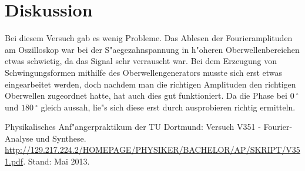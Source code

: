 \section{Diskussion}
\label{diskussion}

	Bei diesem Versuch gab es wenig Probleme. Das Ablesen der Fourieramplituden am Oszilloskop war bei der S"aegezahnspannung in h"oheren Oberwellenbereichen etwas schwietig, da das Signal sehr verrauscht war.
	Bei dem Erzeugung von Schwingungsformen mithilfe des Oberwellengenerators musste sich erst etwas eingearbeitet werden, doch nachdem man die richtigen Amplituden den richtigen Oberwellen zugeordnet hatte, hat auch dies gut funktioniert.
	Da die Phase bei $\SI{0}{^\circ}$ und $\SI{180}{^\circ}$ gleich aussah, lie"s sich diese erst durch ausprobieren richtig ermitteln.

\begin{thebibliography}{9}
	 Physikalisches Anf"angerpraktikum der TU Dortmund: Versuch V351 - Fourier-Analyse und Synthese. \url{http://129.217.224.2/HOMEPAGE/PHYSIKER/BACHELOR/AP/SKRIPT/V351.pdf}. Stand: Mai 2013.
\end{thebibliography}
